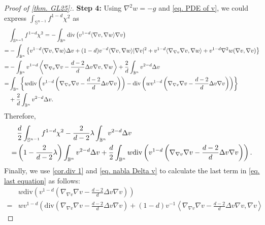 \documentclass[12pt]{amsart}
\numberwithin{equation}{section}
\numberwithin{lemma}{section}
\numberwithin{proposition}{section}
\numberwithin{corollary}{section}
\numberwithin{remark}{section}
\begin{document}
\begin{proof}[Proof of \cref{thm. GL25}:]
    \textbf{Step 4:} Using $\nabla^2 w=-g$ and \cref{eq. PDE of v}, we could express $\int_{\mathbb{S}^{n-1}}f^{1-d}\chi^2$ as
    \begin{align*}
        &\int_{\mathbb{S}^{n-1}}f^{1-d}\chi^2
        =-\int_{\mathbb{B}^n}\mathrm{div}\left(v^{1-d}\langle \nabla v,\nabla w\rangle\nabla v\right)\notag\\
        =&-\int_{\mathbb{B}^n}\left\{v^{1-d}\langle \nabla v,\nabla w\rangle\Delta v+(1-d)v^{-d}\langle \nabla v,\nabla w\rangle|\nabla v|^2
        +v^{1-d}\langle\nabla_{\nabla v}\nabla v,\nabla w\rangle
        +v^{1-d}\nabla^2 w(\nabla v,\nabla v)\right\}\notag\\
        =&-\int_{\mathbb{B}^n}v^{1-d}
        \left\langle\nabla_{\nabla v}\nabla v-\frac{d-2}{d}\Delta v\nabla v,\nabla w\right\rangle
        +\frac{2}{d}\int_{\mathbb{B}^n}v^{2-d}\Delta v\notag\\
        =&\int_{\mathbb{B}^n}\left\{w\mathrm{div}\left(
        v^{1-d}
        \left(\nabla_{\nabla v}\nabla v-\frac{d-2}{d}\Delta v\nabla v\right)
        \right)
        -\mathrm{div}\left(
        wv^{1-d}
        \left(\nabla_{\nabla v}\nabla v-\frac{d-2}{d}\Delta v\nabla v\right)
        \right)\right\}\\
        &+\frac{2}{d}\int_{\mathbb{B}^n}v^{2-d}\Delta v.
    \end{align*}
    Therefore, 
    \begin{align}\label{eq. last equation}
        &\frac{d}{2}\int_{\mathbb{S}^{n-1}}f^{1-d}\chi^2
        -\frac{2}{d-2}\lambda\int_{\mathbb{B}^n}v^{2-d}\Delta v\notag \\
        =&\left(1-\frac{2}{d-2}\lambda\right)
        \int_{\mathbb{B}^n}v^{2-d}\Delta v
        +\frac{d}{2}\int_{\mathbb{B}^n}w\mathrm{div}\left(
        v^{1-d}
        \left(\nabla_{\nabla v}\nabla v-\frac{d-2}{d}\Delta v\nabla v\right)
        \right).
    \end{align}
    Finally, we use \cref{cor.div 1} and \cref{eq. nabla Delta v} to calculate the last term in \cref{eq. last equation} as follows:
    \begin{align*}
        &w\mathrm{div}\left(
        v^{1-d}
        \left(\nabla_{\nabla v}\nabla v-\frac{d-2}{d}\Delta v\nabla v\right)
        \right)\\
        =&wv^{1-d}\left(
            \mathrm{div}
            \left(\nabla_{\nabla v}\nabla v-\frac{d-2}{d}\Delta v\nabla v\right)
            +(1-d)v^{-1}
            \left\langle \nabla_{\nabla v}\nabla v-\frac{d-2}{d}\Delta v\nabla v,\nabla v\right\rangle

\end{align*}
\end{proof}
\end{document}

